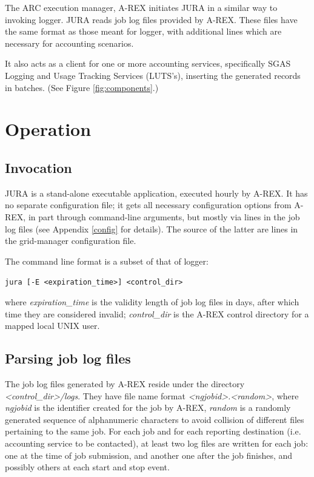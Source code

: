 \documentclass{article}                            %
\begin{document}
The ARC execution manager, A-REX\cite{arex} initiates JURA in a
similar way to invoking logger. JURA reads job log files provided by
A-REX. These files have the same format as those meant for logger,
with additional lines which are necessary for accounting scenarios.

It also acts as a client for one or more accounting services,
specifically SGAS Logging and Usage Tracking Services (LUTS's),
inserting the generated records in batches. (See Figure
\ref{fig:components}.)

\section{Operation}

\subsection{Invocation}

JURA is a stand-alone executable application, executed hourly by
A-REX. It has no separate configuration file; it gets all necessary
configuration options from A-REX, in part through command-line
arguments, but mostly via lines in the job log files (see Appendix
\ref{config} for details). The source of the latter are lines in the
grid-manager configuration file.

The command line format is a subset of that of logger:

\verb|jura [-E <expiration_time>] <control_dir>|

where \textit{expiration\_time} is the validity length of job log
files in days, after which time they are considered invalid;
\textit{control\_dir} is the A-REX control directory for a mapped
local UNIX user.

\subsection{Parsing job log files}
\label{joblogs}
The job log files generated by A-REX reside under the directory
\textit{<control\_dir>/logs}. They have file name format
\textit{<ngjobid>.<random>}, where \textit{ngjobid} is the identifier
created for the job by A-REX, \textit{random} is a randomly generated
sequence of alphanumeric characters to avoid collision of different
files pertaining to the same job. For each job and for each reporting
destination (i.e. accounting service to be contacted), at least two
log files are written for each job: one at the time of job submission,
and another one after the job finishes, and possibly others at each
start and stop event.
\end{document}

